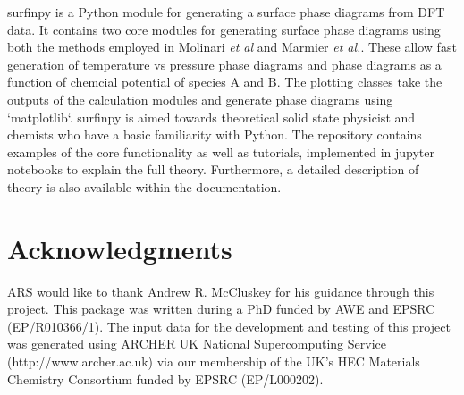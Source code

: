 \documentclass[journal=jacsat,manuscript=article]{achemso}
\begin{document}
surfinpy is a Python module for generating a surface phase diagrams from DFT data. 
It contains two core modules for generating surface phase diagrams using both the methods employed in Molinari \textit{et al} \cite{Molinari2012} and Marmier \textit{et al.}\cite{Marmier2004}. 
These allow fast generation of temperature vs pressure phase diagrams and phase diagrams as a function of chemcial potential of species A and B. 
The plotting classes take the outputs of the calculation modules and generate phase diagrams using `matplotlib`. 
surfinpy is aimed towards theoretical solid state physicist and chemists who have a basic familiarity with Python. 
The repository contains examples of the core functionality as well as tutorials, implemented in jupyter notebooks to explain the full theory.
Furthermore, a detailed description of theory is also available within the documentation. 

\section{Acknowledgments}

ARS would like to thank Andrew R. McCluskey for his guidance through this project. This package was written during a PhD funded by AWE and EPSRC (EP/R010366/1). The input
data for the development and testing of this project was generated using ARCHER UK National Supercomputing Service (http://www.archer.ac.uk) via our membership of 
the UK's HEC Materials Chemistry Consortium funded by EPSRC (EP/L000202). 


\end{document}
